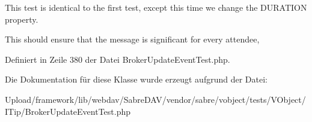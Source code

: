 This test is identical to the first test, except this time we change the D\+U\+R\+A\+T\+I\+ON property.

This should ensure that the message is significant for every attendee, 

Definiert in Zeile 380 der Datei Broker\+Update\+Event\+Test.\+php.



Die Dokumentation für diese Klasse wurde erzeugt aufgrund der Datei\+:\begin{DoxyCompactItemize}
\item 
Upload/framework/lib/webdav/\+Sabre\+D\+A\+V/vendor/sabre/vobject/tests/\+V\+Object/\+I\+Tip/Broker\+Update\+Event\+Test.\+php\end{DoxyCompactItemize}

